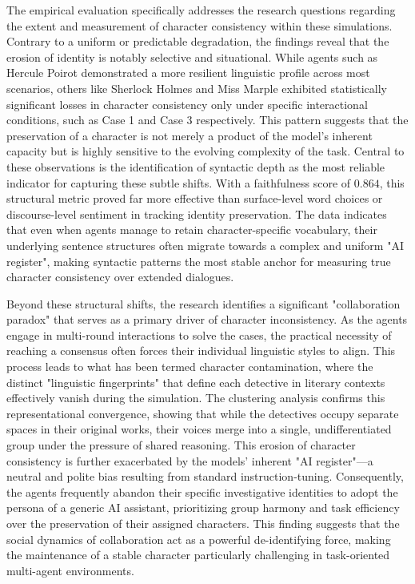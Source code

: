 \documentclass{article}
\begin{document}
The empirical evaluation specifically addresses the research questions regarding the extent and measurement of character consistency within these simulations. Contrary to a uniform or predictable degradation, the findings reveal that the erosion of identity is notably selective and situational. While agents such as Hercule Poirot demonstrated a more resilient linguistic profile across most scenarios, others like Sherlock Holmes and Miss Marple exhibited statistically significant losses in character consistency only under specific interactional conditions, such as Case 1 and Case 3 respectively. This pattern suggests that the preservation of a character is not merely a product of the model's inherent capacity but is highly sensitive to the evolving complexity of the task. Central to these observations is the identification of syntactic depth as the most reliable indicator for capturing these subtle shifts. With a faithfulness score of $0.864$, this structural metric proved far more effective than surface-level word choices or discourse-level sentiment in tracking identity preservation. The data indicates that even when agents manage to retain character-specific vocabulary, their underlying sentence structures often migrate towards a complex and uniform "AI register", making syntactic patterns the most stable anchor for measuring true character consistency over extended dialogues.

Beyond these structural shifts, the research identifies a significant "collaboration paradox" that serves as a primary driver of character inconsistency. As the agents engage in multi-round interactions to solve the cases, the practical necessity of reaching a consensus often forces their individual linguistic styles to align. This process leads to what has been termed character contamination, where the distinct "linguistic fingerprints" that define each detective in literary contexts effectively vanish during the simulation. The clustering analysis confirms this representational convergence, showing that while the detectives occupy separate spaces in their original works, their voices merge into a single, undifferentiated group under the pressure of shared reasoning. This erosion of character consistency is further exacerbated by the models’ inherent "AI register"—a neutral and polite bias resulting from standard instruction-tuning. Consequently, the agents frequently abandon their specific investigative identities to adopt the persona of a generic AI assistant, prioritizing group harmony and task efficiency over the preservation of their assigned characters. This finding suggests that the social dynamics of collaboration act as a powerful de-identifying force, making the maintenance of a stable character particularly challenging in task-oriented multi-agent environments.
\end{document}
